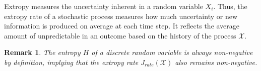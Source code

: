 \documentclass[pdflatex]{sn-jnl}%
\theoremstyle{thmstyleone}
\theoremstyle{thmstyletwo}%
\theoremstyle{thmstylethree}%
\newtheorem{remark}{Remark}%
\begin{document}

Extropy measures the uncertainty inherent in a random variable $X_i$. Thus, the extropy rate of a stochastic process measures how much uncertainty or new information is produced on average at each time step. It reflects the average amount of unpredictable in an outcome based on the history of the process $\bm{\mathcal{X}}$.


\begin{remark}
The entropy $H$ of a discrete random variable is always non-negative by definition, implying that the extropy rate $J_{rate}(\mathcal{X})$ also remains non-negative.
\end{remark}
\end{document}
